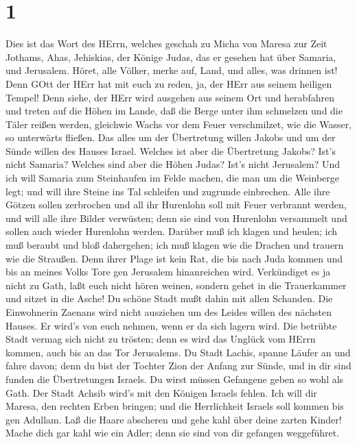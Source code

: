 \hypertarget{section}{%
\section{1}\label{section}}

 Dies ist das Wort des HErrn, welches geschah zu Micha von
Maresa zur Zeit Jothams, Ahas, Jehiskias, der Könige Judas, das er
gesehen hat über Samaria, und Jerusalem.  Höret, alle
Völker, merke auf, Land, und alles, was drinnen ist! Denn GOtt der HErr
hat mit euch zu reden, ja, der HErr aus seinem heiligen Tempel!
 Denn siehe, der HErr wird ausgehen aus seinem Ort und
herabfahren und treten auf die Höhen im Lande,  daß die
Berge unter ihm schmelzen und die Täler reißen werden, gleichwie Wachs
vor dem Feuer verschmilzet, wie die Wasser, so unterwärts fließen.
 Das alles um der Übertretung willen Jakobs und um der Sünde
willen des Hauses Israel. Welches ist aber die Übertretung Jakobs? Ist's
nicht Samaria? Welches sind aber die Höhen Judas? Ist's nicht Jerusalem?
 Und ich will Samaria zum Steinhaufen im Felde machen, die
man um die Weinberge legt; und will ihre Steine ins Tal schleifen und
zugrunde einbrechen.  Alle ihre Götzen sollen zerbrochen und
all ihr Hurenlohn soll mit Feuer verbrannt werden, und will alle ihre
Bilder verwüsten; denn sie sind von Hurenlohn versammelt und sollen auch
wieder Hurenlohn werden.  Darüber muß ich klagen und heulen;
ich muß beraubt und bloß dahergehen; ich muß klagen wie die Drachen und
trauern wie die Straußen.  Denn ihrer Plage ist kein Rat,
die bis nach Juda kommen und bis an meines Volks Tore gen Jerusalem
hinanreichen wird.  Verkündiget es ja nicht zu Gath, laßt
euch nicht hören weinen, sondern gehet in die Trauerkammer und sitzet in
die Asche!  Du schöne Stadt mußt dahin mit allen Schanden.
Die Einwohnerin Zaenans wird nicht ausziehen um des Leides willen des
nächsten Hauses. Er wird's von euch nehmen, wenn er da sich lagern wird.
 Die betrübte Stadt vermag sich nicht zu trösten; denn es
wird das Unglück vom HErrn kommen, auch bis an das Tor Jerusalems.
 Du Stadt Lachis, spanne Läufer an und fahre davon; denn du
bist der Tochter Zion der Anfang zur Sünde, und in dir sind funden die
Übertretungen Israels.  Du wirst müssen Gefangene geben so
wohl als Gath. Der Stadt Achsib wird's mit den Königen Israels fehlen.
 Ich will dir Maresa, den rechten Erben bringen; und die
Herrlichkeit Israels soll kommen bis gen Adullam.  Laß die
Haare abscheren und gehe kahl über deine zarten Kinder! Mache dich gar
kahl wie ein Adler; denn sie sind von dir gefangen weggeführet.

